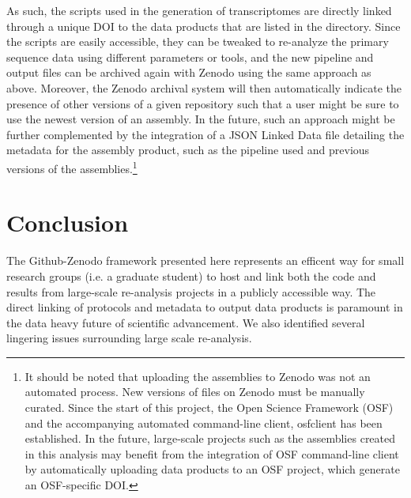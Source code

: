 \documentclass[a4paper,num-refs]{oup-contemporary}
\begin{document}
As such, the scripts used in the generation of transcriptomes are
directly linked through a unique DOI to the data products that are
listed in the directory. Since the scripts are easily accessible, they
can be tweaked to re-analyze the primary sequence data using different
parameters or tools, and the new pipeline and output files can be
archived again with Zenodo using the same approach as above.
Moreover, the Zenodo archival system will then automatically indicate
the presence of other versions of a given repository such that a user
might be sure to use the newest version of an assembly. In the future,
such an approach might be further complemented by the integration of a
JSON Linked Data file detailing the metadata for the assembly product,
such as the pipeline used and previous versions of the assemblies.\footnote{It should be noted that uploading the assemblies to Zenodo was not an automated process. New versions of files on Zenodo must be manually curated. Since the start of this project, the Open Science Framework (OSF) and the accompanying automated command-line client, osfclient has been established. In the future, large-scale projects such as the assemblies created in this analysis may benefit from the integration of OSF command-line client by automatically uploading data products to an OSF project, which generate an OSF-specific DOI.}

\section{Conclusion}

The Github-Zenodo framework presented here represents an efficent way for small research groups (i.e. a graduate
student) to host and link both the code and results from large-scale re-analysis projects in a publicly accessible way. The direct linking of protocols and
metadata to output data products is paramount in the data heavy future
of scientific advancement. We also identified several lingering issues surrounding large scale
re-analysis.
\end{document}
